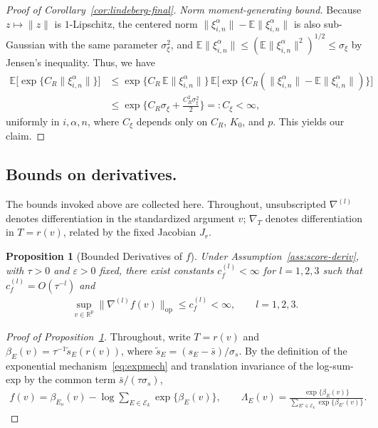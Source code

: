 \documentclass[12pt]{article}
\newcommand{\op}{\mathrm{op}}
\newtheorem{proposition}{Proposition}[section]
\newcommand{\real}{\mathbb{R}}
\newcommand{\Ee}{{\mathbb{E}}}
\newcommand{\Ek}{\mathcal{E}_{k}}      %
\newcommand{\snoise}{\sigma_{s}}
\begin{document}
\begin{appendices}
\begin{proof}[Proof of Corollary~\ref{cor:lindeberg-final}]
\medskip\noindent\textit{Norm moment-generating bound.}
Because $z\mapsto\|z\|$ is $1$-Lipschitz, the centered norm
$\|\xi^\alpha_{i,n}\|-\Ee\|\xi^\alpha_{i,n}\|$ is also sub-Gaussian with the
same parameter $\sigma_\xi^2$, and $\Ee\|\xi^\alpha_{i,n}\|
\le(\Ee\|\xi^\alpha_{i,n}\|^2)^{1/2}\le\sigma_\xi$ by Jensen's inequality. 
Thus, we have
\begin{align*}
  \Ee\big[\exp\{C_R\|\xi^\alpha_{i,n}\|\}\big]
  &\le\exp\{C_R\,\Ee\|\xi^\alpha_{i,n}\|\}\,
     \Ee\big[\exp\{C_R(\|\xi^\alpha_{i,n}\|-\Ee\|\xi^\alpha_{i,n}\|)\}\big]\\
  &\le\exp\Big\{C_R\sigma_\xi+\frac{C_R^2\sigma_\xi^2}{2}\Big\}
  =:C_\xi<\infty,
\end{align*}
uniformly in $i,\alpha,n$, where $C_\xi$ depends only on $C_R$, $K_0$,
and $p$. 
This yields our claim.
\end{proof}

\subsection{Bounds on derivatives.}
\label{app:deriv-bounds}
The bounds invoked above are collected here. Throughout, unsubscripted $\nabla^{(l)}$ denotes differentiation in the standardized argument $v$; $\nabla_T$ denotes differentiation in $T=r(v)$, related by the fixed Jacobian $J_r$.

\begin{proposition}[Bounded Derivatives of $f$]
\label{prop:f_bounded_deriv}
Under Assumption~\ref{ass:score-deriv}, with $\tau > 0$ and
$\varepsilon > 0$ fixed, there exist constants
$c_f^{(l)} < \infty$ for $l = 1, 2, 3$ such that $c_f^{(l)} = O(\tau^{-l})$ and
\begin{align}
  \label{eq:f-bound}
  \sup_{v \in \real^p}
  \|\nabla^{(l)} f(v)\|_{\op}
  \leq c_f^{(l)} < \infty, \qquad l=1,2,3.
\end{align} 
\end{proposition}

\begin{proof}[Proof of Proposition~\ref{prop:f_bounded_deriv}]
Throughout, write $T=r(v)$ and
$\beta_E(v)=\tau^{-1}\widetilde s_E(r(v))$, where
$\widetilde s_E=(s_E-\bar s)/\snoise$. By the definition of the
exponential mechanism~\eqref{eq:expmech} and translation invariance of
the log-sum-exp by the common term $\bar s/(\tau\snoise)$,
\begin{align}
  \label{eq:f-beta-clean}
  f(v)=\beta_{E_o}(v)
       -\log\!\sum_{E\in\Ek}\exp\{\beta_E(v)\},
  \qquad
  \Lambda_E(v)=\frac{\exp\{\beta_E(v)\}}{\sum_{E'\in\Ek}\exp\{\beta_{E'}(v)\}}.
\end{align}


\end{proof}
\end{appendices}
\end{document}

